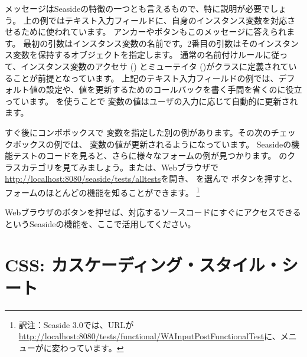 \documentclass[a4paper,10pt,twoside]{book}
\begin{document}
メッセージはSeasideの特徴の一つとも言えるもので、特に説明が必要でしょう。
上の例ではテキスト入力フィールドに、自身のインスタンス変数を対応させるために使われています。
アンカーやボタンもこのメッセージに答えられます。
最初の引数はインスタンス変数の名前です。2番目の引数はそのインスタンス変数を保持するオブジェクトを指定します。
通常の名前付けルールに従って、インスタンス変数のアクセサ () とミューテイタ ()がクラスに定義されていることが前提となっています。
上記のテキスト入力フィールドの例では、デフォルト値の設定や、値を更新するためのコールバックを書く手間を省くのに役立っています。
を使うことで  変数の値はユーザの入力に応じて自動的に更新されます。

すぐ後にコンボボックスで 変数を指定した別の例があります。その次のチェックボックスの例では、  変数の値が更新されるようになっています。
Seasideの機能テストのコードを見ると、さらに様々なフォームの例が見つかります。
のクラスカテゴリを見てみましょう。または、Webブラウザで\url{http://localhost:8080/seaside/tests/alltests}を開き、
 を選んで  ボタンを押すと、フォームのほとんどの機能を知ることができます。
\footnote{訳注：Seaside 3.0では、URLが\url{http://localhost:8080/tests/functional/WAInputPostFunctionalTest}に、メニューがに変わっています。}

Webブラウザのボタンを押せば、対応するソースコードにすぐにアクセスできるというSeasideの機能を、ここで活用してください。

\section{CSS: カスケーディング・スタイル・シート}

\end{document}
